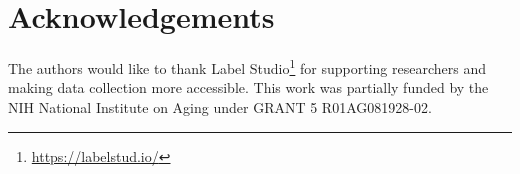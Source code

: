 \documentclass{Interspeech2024}
\newcommand{\red}[1]{\textcolor{red}{#1}}
\begin{document}
\section{Acknowledgements}
The authors would like to thank Label Studio\footnote{\url{https://labelstud.io/}} for supporting researchers and making data collection more accessible. This work was partially funded by the NIH National Institute on Aging under GRANT 5 R01AG081928-02.






\end{document}
